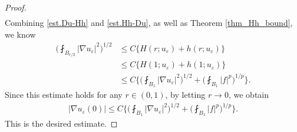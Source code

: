 \documentclass[reqno,12pt]{amsart} %
\newtheorem{theorem}{Theorem}[section]
\theoremstyle{definition}
\theoremstyle{remark}
\numberwithin{equation}{section}
\begin{document}
\begin{proof}
\begin{align}
  \end{align}
  Combining \eqref{est.Du-Hh} and \eqref{est.Hh-Du}, as well as Theorem \ref{thm_Hh_bound}, we know
  \begin{align*}
    \bigg(\fint_{B_{r/2}}|\nabla u_\varepsilon|^2\bigg)^{1/2}&\leq C\{H(r; u_\varepsilon)+h(r; u_\varepsilon)\}\\&\leq C\{H(1; u_\varepsilon)+h(1; u_\varepsilon)\}\\&\leq C\bigg\{\bigg(\fint_{B_1}|\nabla u_\varepsilon|^2\bigg)^{1/2}+\bigg(\fint_{B_{1}}|f|^p\bigg)^{1/p}\bigg\}.
  \end{align*}
  Since this estimate holds for any $r\in (0,1)$, by
  letting $r\rightarrow0$, we obtain
  \begin{align*}
    |\nabla u_\varepsilon(0)|\leq C\bigg\{\bigg(\fint_{B_1}|\nabla u_\varepsilon|^2\bigg)^{1/2}+\bigg(\fint_{B_1}|f|^p\bigg)^{1/p}\bigg\}.
  \end{align*}
  This is the desired estimate.
\end{proof}

\end{document}
